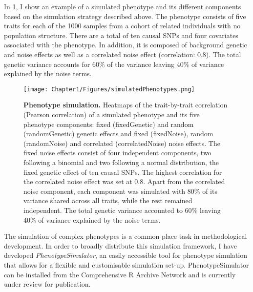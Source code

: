 In \cref{fig:simulation}, I show an example of a simulated phenotype and its different components based on the simulation strategy described above. The phenotype consists of five traits for each of the \num{1000} samples from a cohort of related individuals with no population structure. There are a total of ten causal SNPs and four covariates associated with the phenotype. In addition, it is composed of background genetic and noise effects as well as a correlated noise effect (correlation: \num{0.8}). The total genetic variance accounts for \num{60}\% of the variance leaving \num{40}\% of variance explained by the noise terms.

\begin{figure}[hbtp]
	\centering
	\texttt{[image: Chapter1/Figures/simulatedPhenotypes.png]}
	\caption[\textbf{Phenotype simulation.}]{\textbf{Phenotype simulation.} Heatmaps of the trait-by-trait correlation (Pearson correlation) of a simulated phenotype and its five phenotype components: fixed (fixedGenetic) and random (randomGenetic) genetic effects and fixed (fixedNoise), random (randomNoise) and correlated (correlatedNoise) noise effects. The fixed noise effects consist of four independent components, two following a binomial and two following a normal distribution, the fixed genetic effect of ten causal SNPs. The highest correlation for the correlated noise effect was set at \num{0.8}. Apart from the correlated noise component, each component was simulated with \num{80}\% of its variance shared across all traits, while the rest remained independent. The total genetic variance accounted to \num{60}\% leaving \num{40}\% of variance explained by the noise terms.}
	\label{fig:simulation}
\end{figure}

The simulation of complex phenotypes is a common place task in methodological development. In order to broadly distribute this simulation framework, I have developed \textit{PhenotypeSimulator}, an easily accessible tool for phenotype simulation that allows for a flexible and customisable simulation set-up. PhenotypeSimulator can be installed from the Comprehensive R Archive Network \citep{Meyer2017} and is currently under review for publication.
